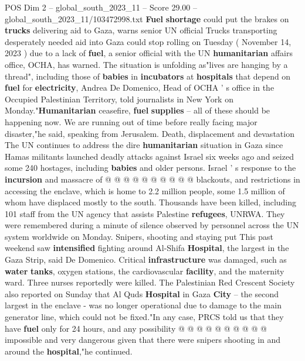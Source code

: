 \begin{textsample}{POS Dim 2 – global\_south\_2023\_11 – Score 29.00 – global\_south\_2023\_11/103472998.txt}  \label{ex:f2_pos_096}
\textbf{Fuel} \textbf{shortage} could put the brakes on \textbf{trucks} delivering aid to Gaza, warns senior UN official Trucks transporting desperately needed aid into Gaza could stop rolling on Tuesday ( November 14, 2023 ) due to a lack of \textbf{fuel}, a senior official with the UN \textbf{humanitarian} affairs office, OCHA, has warned.
The situation is unfolding as"lives are hanging by a thread", including those of \textbf{babies} in \textbf{incubators} at \textbf{hospitals} that depend on \textbf{fuel} for \textbf{electricity}, Andrea De Domenico, Head of OCHA ' s office in the Occupied Palestinian Territory, told journalists in New York on Monday."\textbf{Humanitarian} ceasefire, \textbf{fuel} \textbf{supplies} -- all of these should be happening now.
We are running out of time before really facing major disaster,"he said, speaking from Jerusalem.
Death, displacement and devastation The UN continues to address the dire \textbf{humanitarian} situation in Gaza since Hamas militants launched deadly attacks against Israel six weeks ago and seized some 240 hostages, including \textbf{babies} and older persons.
Israel ' s response to the \textbf{incursion} and massacre of @ @ @ @ @ @ @ @ @ @ blackouts, and restrictions in accessing the enclave, which is home to 2.2 million people, some 1.5 million of whom have displaced mostly to the south.
Thousands have been killed, including 101 staff from the UN agency that assists Palestine \textbf{refugees}, UNRWA.
They were remembered during a minute of silence observed by personnel across the UN system worldwide on Monday.
Snipers, shooting and staying put This past weekend saw \textbf{intensified} fighting around Al-Shifa \textbf{Hospital}, the largest in the Gaza Strip, said De Domenico.
Critical \textbf{infrastructure} was damaged, such as \textbf{water} \textbf{tanks}, oxygen stations, the cardiovascular \textbf{facility}, and the maternity ward.
Three nurses reportedly were killed.
The Palestinian Red Crescent Society also reported on Sunday that Al Quds \textbf{Hospital} in Gaza \textbf{City} -- the second largest in the enclave - was no longer operational due to damage to the main generator line, which could not be fixed."In any case, PRCS told us that they have \textbf{fuel} only for 24 hours, and any possibility @ @ @ @ @ @ @ @ @ @ impossible and very dangerous given that there were snipers shooting in and around the \textbf{hospital},"he continued.

\end{textsample}
